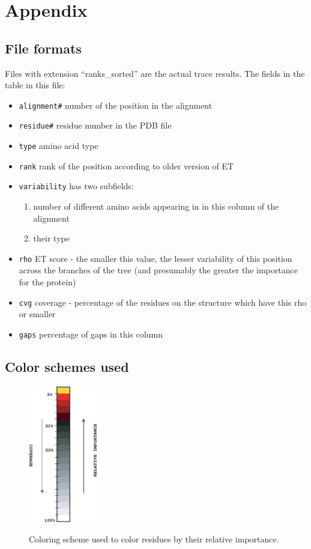 \section{Appendix}
\subsection{File formats}
Files with extension ``ranks\_sorted''  are the actual trace results.
The fields in the table in this file:
\begin{itemize}
\item {\tt alignment\#}     number of the position in the alignment
\item {\tt residue\#}        residue number in the PDB file
\item {\tt type}            amino acid type
\item {\tt rank}            rank of the position according to older version of ET
\item {\tt variability}     has two subfields:
  \begin{enumerate}
                \item number of different amino acids appearing in
                    in this column  of the alignment
                \item  their type
  \end{enumerate}
		  
\item {\tt rho}             ET score - the smaller this value, the lesser variability
                of this position across the branches of the tree
                (and presumably the greater the importance for the protein)
\item {\tt cvg}             coverage - percentage of the residues on the structure which
                have this rho or smaller
\item {\tt gaps}            percentage of gaps in this column
\end{itemize}

\subsection{Color schemes used}
\begin{figure} [t]
{
  \center
  \includegraphics[height=60mm] {colorbar.eps}
}
\caption{\label{colorbar} Coloring scheme used to color residues by their relative importance.}
\end{figure}


